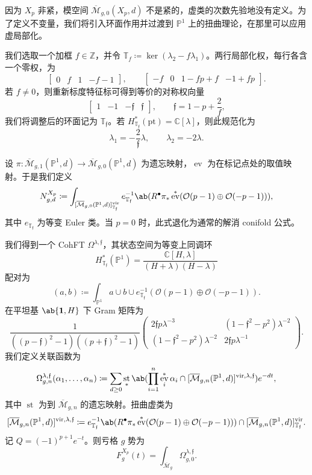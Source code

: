 \documentclass{amsart}
\theoremstyle{definition}
\theoremstyle{remark}
\theoremstyle{plain}
\theoremstyle{definition}
\theoremstyle{remark}
\newcommand{\C}{\mathbb{C}}
\newcommand{\Z}{\mathbb{Z}}
\renewcommand{\P}{\mathbb{P}}
\newcommand{\Mbar}{\overline{\mathcal{M}}}
\newcommand{\mc}[1]{\mathcal{#1}}
\newcommand{\T}{\mathbb{T}}
\newcommand{\mf}[1]{\mathfrak{#1}}
\newcommand{\mr}[1]{\mathrm{#1}}
\newcommand{\1}{\mathbf{1}}
\newcommand{\2}{\mathbf{2}}
\newcommand{\3}{\mathbf{3}}
\newcommand{\vir}{\mr{vir}}
\DeclareMathOperator{\ev}{ev}
\DeclareMathOperator{\st}{st}
\begin{document}
因为 \(X_p\) 非紧，模空间 \(\Mbar_{g,0}(X_p,d)\) 不是紧的，虚类的次数先验地没有定义。为了定义不变量，我们将引入环面作用并过渡到 \(\P^1\) 上的扭曲理论，在那里可以应用虚局部化。

我们选取一个加框 \(f \in \Z\)，并令 \(\T_f \coloneqq \ker(\lambda_2 - f\lambda_1)\)。两行局部化权，每行各含一个零权，为
\[ \begin{bmatrix} 0 & f & 1 & -f-1 \end{bmatrix}, \qquad \begin{bmatrix} -f & 0 & 1-fp+f & -1+fp \end{bmatrix}. \]
若 \(f \neq 0\)，则重新标度特征标可得到等价的对称权向量
\[ \begin{bmatrix} 1 & -1 & -\mf{f} & \mf{f} \end{bmatrix}, \qquad \mf{f} = 1-p+\frac{2}{f}, \]
我们将调整后的环面记为 \(\T_{\mf{f}}\)。若 \(H^*_{\T_{\mf{f}}}(\mr{pt}) = \C[\lambda]\)，则此规范化为
\[ \lambda_1 = -\frac{2}{\mf{f}}\lambda, \qquad \lambda_2 = -2\lambda. \]

设 \(\pi \colon \Mbar_{g,1}(\P^1,d) \to \Mbar_{g,0}(\P^1,d)\) 为遗忘映射，\(\ev\) 为在标记点处的取值映射。于是我们定义
\[ N^{X_p}_{g,d} \coloneqq \int_{[\Mbar_{g,0}(\P^1,d)]^{\vir}_{\T_{\mf{f}}}} e_{\T_{\mf{f}}}^{-1}\ab(R^{\bullet}\pi_* \ev^*(\mc{O}(p-1)\oplus\mc{O}(-p-1))), \]
其中 \(e_{\T_{\mf{f}}}\) 为等变 Euler 类。当 \(p=0\) 时，此式退化为通常的解消 conifold 公式。

我们得到一个 CohFT \(\Omega^{\lambda,\mf{f}}\)，其状态空间为等变上同调环
\[ H^*_{\T_{\mf{f}}}(\P^1) = \frac{\C[H,\lambda]}{(H+\lambda)(H-\lambda)} \]
配对为
\[ (a,b) \coloneqq \int_{\P^1} a \cup b \cup e^{-1}_{\T_{\mf{f}}}(\mc{O}(p-1)\oplus\mc{O}(-p-1)). \]
在平坦基 \(\ab\{\1,H\}\) 下 Gram 矩阵为
\[ \frac{1}{((p-\mf{f})^2-1)((p+\mf{f})^2-1)}\begin{pmatrix} 2\mf{f}p\lambda^{-3} & (1-\mf{f}^2-p^2)\lambda^{-2} \\ (1-\mf{f}^2-p^2)\lambda^{-2} & 2\mf{f}p\lambda^{-1} \end{pmatrix}. \]
我们定义关联函数为
\[ \Omega^{\lambda,\mf{f}}_{g,n}(\alpha_1,\ldots,\alpha_n) \coloneqq \sum_{d\geq0}\st_*\ab(\prod_{i=1}^n \ev_i^*\alpha_i \cap [\Mbar_{g,n}(\P^1,d)]^{\vir,\lambda,\mf{f}})e^{-dt}, \]
其中 \(\st\) 为到 \(\Mbar_{g,n}\) 的遗忘映射。扭曲虚类为
\[ [\Mbar_{g,n}(\P^1,d)]^{\vir,\lambda,\mf{f}} \coloneqq e^{-1}_{\T_{\mf{f}}}\ab(R^{\bullet}\pi_*\ev^*(\mc{O}(p-1)\oplus\mc{O}(-p-1))) \cap [\Mbar_{g,n}(\P^1,d)]^{\vir}_{\T_{\mf{f}}}. \]
记 \(Q = (-1)^{p+1}e^{-t}\)。则亏格 \(g\) 势为
\[ F^{X_p}_g(t) = \int_{\Mbar_g} \Omega^{\lambda,\mf{f}}_{g,0}. \]
\end{document}
